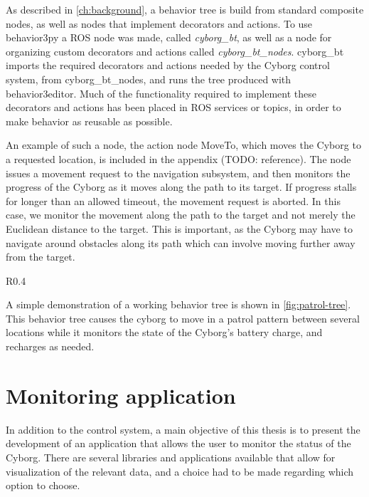 \documentclass[\rootfolder/main.tex]{subfiles}
\begin{document}
As described in \cref{ch:background}, a behavior tree is build from standard composite nodes, as well as nodes that implement decorators and actions.
To use behavior3py a ROS node was made, called \emph{cyborg\_bt}, as well as a node for organizing custom decorators and actions called \emph{cyborg\_bt\_nodes}.
cyborg\_bt imports the required decorators and actions needed by the Cyborg control system, from cyborg\_bt\_nodes, and runs the tree produced with behavior3editor.
Much of the functionality required to implement these decorators and actions has been placed in ROS services or topics, in order to make behavior as reusable as possible.

An example of such a node, the action node MoveTo, which moves the Cyborg to a requested location, is included in the appendix (TODO: reference).
The node issues a movement request to the navigation subsystem, and then monitors the progress of the Cyborg as it moves along the path to its target.
If progress stalls for longer than an allowed timeout, the movement request is aborted.
In this case, we monitor the movement along the path to the target and not merely the Euclidean distance to the target.
This is important, as the Cyborg may have to navigate around obstacles along its path which can involve moving further away from the target.

\begin{wrapfigure}{R}{0.4\columnwidth}
    \caption{Behavior tree that checks battery state, and charges if necessary, while patrolling}
    \label{fig:patrol-tree}
\end{wrapfigure}

A simple demonstration of a working behavior tree is shown in \cref{fig:patrol-tree}.
This behavior tree causes the cyborg to move in a patrol pattern between several locations while it monitors the state of the Cyborg's battery charge, and recharges as needed.

\section{Monitoring application}

In addition to the control system, a main objective of this thesis is to present the development of an application that allows the user to monitor the status of the Cyborg.
There are several libraries and applications available that allow for visualization of the relevant data, and a choice had to be made regarding which option to choose.
\end{document}
